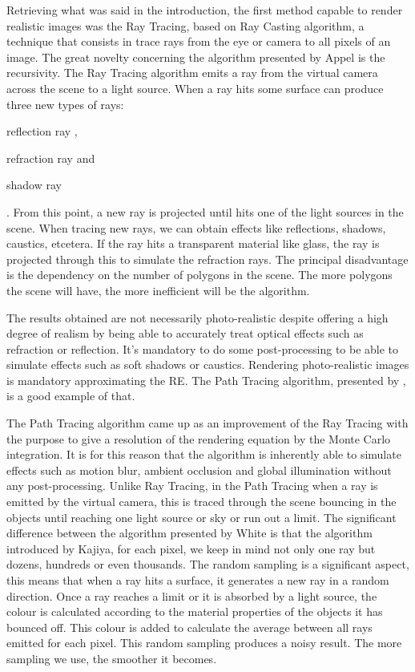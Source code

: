 \documentclass[titlepage,12pt]{article}
\begin{document}
Retrieving what was said in the introduction, the first method capable to render realistic images was the Ray Tracing, based on Ray Casting algorithm, a technique that consists in trace rays from the eye or camera to all pixels of an image. The great novelty concerning the algorithm presented by Appel is the recursivity. The Ray Tracing algorithm emits a ray from the virtual camera across the scene to a light source. When a ray hits some surface can produce three new types of rays: \begin{enumerate*}[label=\roman*)] \item
 reflection ray \label{ray:reflected}, \item
 refraction ray and \item
 shadow ray\end{enumerate*}. From this point, a new ray is projected until hits one of the light sources in the scene. When tracing new rays, we can obtain effects like reflections, shadows, caustics, etcetera. If the ray hits a transparent material like glass, the ray is projected through this to simulate the refraction rays. The principal disadvantage is the dependency on the number of polygons in the scene. The more polygons the scene will have, the more inefficient will be the algorithm.

The results obtained are not necessarily photo-realistic despite offering a high degree of realism by being able to accurately treat optical effects such as refraction or reflection. It's mandatory to do some post-processing to be able to simulate effects such as soft shadows or caustics. Rendering photo-realistic images is mandatory approximating the RE. The Path Tracing algorithm, presented by \citep[pp. ~143--150]{Kajiya1986}, is a good example of that.

The Path Tracing algorithm came up as an improvement of the Ray Tracing with the purpose to give a resolution of the rendering equation by the Monte Carlo integration. It is for this reason that the algorithm is inherently able to simulate effects such as motion blur, ambient occlusion and global illumination without any post-processing. Unlike Ray Tracing, in the Path Tracing when a ray is emitted by the virtual camera, this is traced through the scene bouncing in the objects until reaching one light source or sky or run out a limit. The significant difference between the algorithm presented by White is that the algorithm introduced by Kajiya, for each pixel, we keep in mind not only one ray but dozens, hundreds or even thousands. The random sampling is a significant aspect, this means that when a  ray hits a surface, it generates a new ray in a random direction. Once a ray reaches a limit or it is absorbed by a light source, the colour is calculated according to the material properties of the objects it has bounced off. This colour is added to calculate the average between all rays emitted for each pixel. This random sampling produces a noisy result. The more sampling we use, the smoother it becomes.
\end{document}

